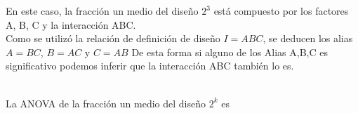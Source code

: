 \documentclass[12pt]{beamer}
\begin{document}
\begin{frame}
En este caso, la fracción un medio del diseño $2^3$ está compuesto por los factores A, B, C y la interacción ABC.
~\\Como se utilizó la relación de definición de diseño $I=ABC$, se deducen los alias $A=BC$, $B=AC$ y $C=AB$ De esta forma si alguno de los Alias A,B,C es significativo podemos inferir que la interacción ABC también lo es.

~\\La ANOVA de la fracción un medio del diseño $2^k$ es
\begin{table}[H]
  \centering
  \caption{Análisis de varianza factorial fraccionado}
  \label{tab:addlabel}%
\end{table}%
\end{frame}
\end{document}
